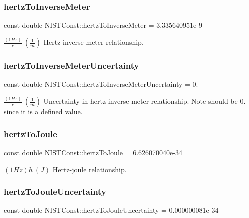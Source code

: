 \subsubsection{\texorpdfstring{hertz\+To\+Inverse\+Meter}{hertzToInverseMeter}}
{\footnotesize\ttfamily const double N\+I\+S\+T\+Const\+::hertz\+To\+Inverse\+Meter = 3.\+335640951e-\/9}

$\frac{(1 Hz)}{c} \ (\frac{1}{m})$ Hertz-\/inverse meter relationship. \mbox{\label{group___hertz_ga4a12fd74059017b7f715ed732182c47b}} 
\subsubsection{\texorpdfstring{hertz\+To\+Inverse\+Meter\+Uncertainty}{hertzToInverseMeterUncertainty}}
{\footnotesize\ttfamily const double N\+I\+S\+T\+Const\+::hertz\+To\+Inverse\+Meter\+Uncertainty = 0.}

$\frac{(1 Hz)}{c} \ (\frac{1}{m})$ Uncertainty in hertz-\/inverse meter relationship. Note should be 0. since it is a defined value. \mbox{\label{group___hertz_ga827c4e99287fcd5363fabcfe1381cc37}} 
\subsubsection{\texorpdfstring{hertz\+To\+Joule}{hertzToJoule}}
{\footnotesize\ttfamily const double N\+I\+S\+T\+Const\+::hertz\+To\+Joule = 6.\+626070040e-\/34}

$(1 Hz)h \ (J)$ Hertz-\/joule relationship. \mbox{\label{group___hertz_ga6fde96f31fcfe10060d6996d0d5ff117}} 
\subsubsection{\texorpdfstring{hertz\+To\+Joule\+Uncertainty}{hertzToJouleUncertainty}}
{\footnotesize\ttfamily const double N\+I\+S\+T\+Const\+::hertz\+To\+Joule\+Uncertainty = 0.\+000000081e-\/34}

